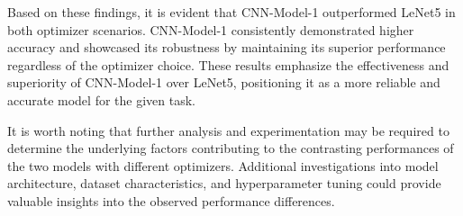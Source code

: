 \noindent Based on these findings, it is evident that CNN-Model-1 outperformed LeNet5 in both optimizer scenarios. CNN-Model-1 consistently demonstrated higher accuracy and showcased its robustness by maintaining its superior performance regardless of the optimizer choice. These results emphasize the effectiveness and superiority of CNN-Model-1 over LeNet5, positioning it as a more reliable and accurate model for the given task.

\noindent It is worth noting that further analysis and experimentation may be required to determine the underlying factors contributing to the contrasting performances of the two models with different optimizers. Additional investigations into model architecture, dataset characteristics, and hyperparameter tuning could provide valuable insights into the observed performance differences.

% 
